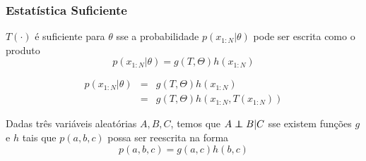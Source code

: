 \begin{frame}[allowframebreaks]
  \frametitle{Estatística Suficiente}
        \begin{theorem}
        $T(\cdot)$ é suficiente para $\theta$ sse a probabilidade $p(x_{1:N}|\theta)$
        pode ser escrita como o produto
        \begin{equation}
        p(x_{1:N}|\theta) = g(T,\Theta)h(x_{1:N})
        \end{equation}
        \end{theorem}

        \begin{eqnarray}
        p(x_{1:N}|\theta) &=& g(T,\Theta)h(x_{1:N}) \nonumber \\
                        &=& g(T,\Theta)h(x_{1:N}, T(x_{1:N}))
        \end{eqnarray}

        \framebreak

        \begin{definition}
        Dadas três variáveis aleatórias $A,B,C$, temos que $A\independent B \vert C$ sse
        existem funções $g$ e $h$ tais que $p(a,b,c)$ possa ser reescrita na forma
                \begin{equation}
                p(a,b,c) = g(a,c) h(b,c)
                \end{equation}
        \end{definition}
\end{frame}

